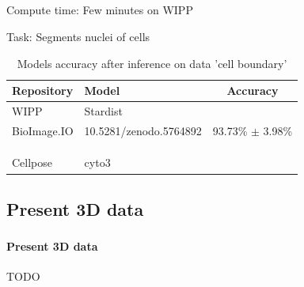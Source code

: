 \subsection{\slidetitle}
\begin{frame}
  \frametitle{\sectiontitle}
  \framesubtitle{\slidetitle}

  Compute time: Few minutes on WIPP

  Task: Segments nuclei of cells

  \begin{center}
    \begin{table}
        \begin{tabular}{|l|l|c|}
            \hline
            \rowcolor{tableFirstRowColor}  Repository   & Model                     & Accuracy \\ [0.5ex]
            \hline
            \cellcolor{tableFirstColColor} WIPP         & Stardist                  &  \\
            \hline
            \cellcolor{tableFirstColColor} BioImage.IO  & 10.5281/zenodo.5764892    & 93.73\% $\pm$ 3.98\% \\
            \hline
            \cellcolor{tableFirstColColor}           &                  &  \\
            \hline
            \cellcolor{tableFirstColColor}           &                  &  \\
            \hline
            \cellcolor{tableFirstColColor}           &                  &  \\
            \hline
            \cellcolor{tableFirstColColor} Cellpose     & cyto3                     &  \\
            \hline
        \end{tabular}
      \caption{Models accuracy after inference on data 'cell boundary'}
    \end{table}
  \end{center}

\end{frame}

\iffalse
\def\slidetitle{Present 3D data}

\subsection{\slidetitle}
\begin{frame}
  \frametitle{\sectiontitle}
  \framesubtitle{\slidetitle}

  TODO

\end{frame}

